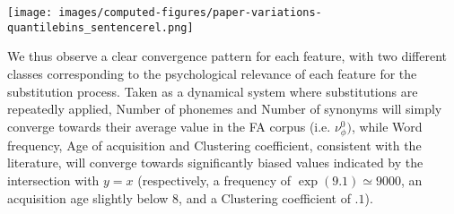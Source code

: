 \begin{figure*}[!th]
    \centering
    \texttt{[image: images/computed-figures/paper-variations-quantilebins\_sentencerel.png]}
    \caption{}
    \label{fig:feature-variations-sentencerel}
\end{figure*}

\medskip
We thus observe a clear convergence pattern for each feature, with two different classes corresponding to the psychological relevance of each feature for the substitution process.
Taken as a dynamical system where substitutions are repeatedly applied, Number of phonemes and Number of synonyms will simply converge towards their average value in the FA corpus (i.e. $\nu_{\phi}^0)$, while Word frequency, Age of acquisition and Clustering coefficient, consistent with the literature, will converge towards significantly biased values indicated by the intersection with $y = x$ (respectively, a frequency of $\exp(9.1) \simeq 9000$, an acquisition age slightly below 8, and a Clustering coefficient of $.1$).

